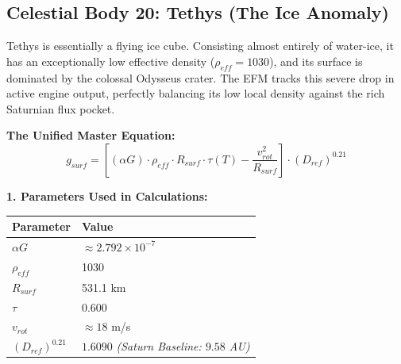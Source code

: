 \documentclass[11pt, a4paper]{article}
\begin{document}
\clearpage
\subsection{Celestial Body 20: Tethys (The Ice Anomaly)}
  Tethys is essentially a flying ice cube. Consisting almost entirely of water-ice, it has an exceptionally low effective density ($\rho_{eff} = 1030$), and its surface is dominated by the colossal Odysseus crater. The EFM tracks this severe drop in active engine output, perfectly balancing its low local density against the rich Saturnian flux pocket.

  \vspace{0.5em}
  \noindent \textbf{The Unified Master Equation:}
  $$ g_{surf} = \left[ (\alpha G) \cdot \rho_{eff} \cdot R_{surf} \cdot \tau(T) - \frac{v_{rot}^2}{R_{surf}} \right] \cdot (D_{ref})^{0.21} $$

  \vspace{0.5em}
  \noindent \textbf{1. Parameters Used in Calculations:} \\[0.5em]
  \begingroup
  \renewcommand{\arraystretch}{1.3}
  \hspace*{2em}
  \begin{tabular}{|l|l|}
    \hline
    \textbf{Parameter} & \textbf{Value} \\ \hline
    $\alpha G$ & $\approx 2.792 \times 10^{-7}$ \\ \hline
    $\rho_{eff}$ & 1030 \\ \hline
    $R_{surf}$ & 531.1 km \\ \hline
    $\tau$ & 0.600 \\ \hline
    $v_{rot}$ & $\approx 18$ m/s \\ \hline
    $(D_{ref})^{0.21}$ & $1.6090$ \textit{(Saturn Baseline: $9.58$ AU)} \\ \hline
  \end{tabular}
  \endgroup
\end{document}
